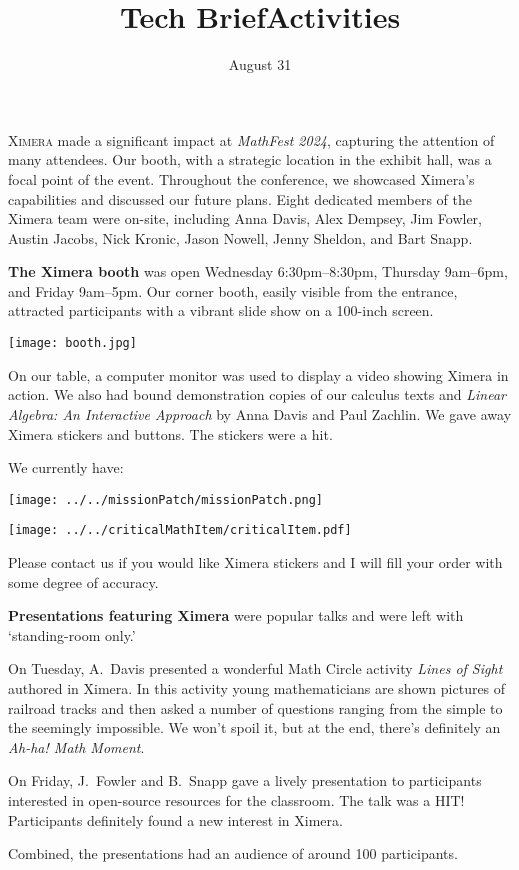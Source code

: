 \documentclass{techbrief}
\title{Tech Brief}
\title{Activities}
\date{August 31}
\begin{document}
\pagestyle{main}
\thispagestyle{title}
\noindent

\lettrine[lines=2]{X}{imera} made a significant impact at \textit{MathFest
    2024},
capturing the attention of many attendees. Our booth, with a strategic location
in
the exhibit hall, was a focal point of the event. Throughout the conference, we
showcased Ximera's capabilities and discussed our future plans.
Eight dedicated members of the Ximera team were on-site, including Anna Davis,
Alex Dempsey, Jim Fowler, Austin Jacobs, Nick Kronic, Jason Nowell, Jenny
Sheldon, and Bart Snapp.

\begin{xframe}
    \textbf{The Ximera booth} was open Wednesday 6:30pm--8:30pm, Thursday
    9am--6pm, and Friday 9am--5pm. Our corner booth, easily visible from the
    entrance, attracted participants with a vibrant slide show on a 100-inch
    screen.
    \begin{center}
        \texttt{[image: booth.jpg]}
    \end{center}
    On our table, a computer monitor was used to display a video showing Ximera
    in action.
    We also had bound demonstration copies of our calculus texts and
    \textit{Linear Algebra: An Interactive Approach} by Anna Davis and Paul
    Zachlin.
    We gave away Ximera stickers and buttons. The stickers were a hit.

    We currently have:
    \begin{center}

        \texttt{[image: ../../missionPatch/missionPatch.png]}
        \qquad

        \texttt{[image: ../../criticalMathItem/criticalItem.pdf]}
    \end{center}
    Please contact us if you would like Ximera stickers and I will fill your
    order with some degree of accuracy.
\end{xframe}

\begin{xframe}
    \textbf{Presentations featuring Ximera} were popular talks and were left
    with `standing-room only.'

    On Tuesday, A.\ Davis presented a wonderful Math Circle activity
    \textit{Lines of Sight} authored in Ximera.
    In this activity young mathematicians are shown pictures of railroad tracks
    and then asked a number of questions ranging from the simple to the
    seemingly
    impossible. We won't spoil it, but at the end, there's definitely an
    \textit{Ah-ha! Math Moment}.

    On Friday, J.\ Fowler and B.\ Snapp gave a lively presentation to
    participants interested in open-source resources for the classroom. The
    talk
    was
    a HIT! Participants  definitely found a new interest in Ximera.

    Combined, the presentations had an audience of around 100 participants.
\end{xframe}
\end{document}
